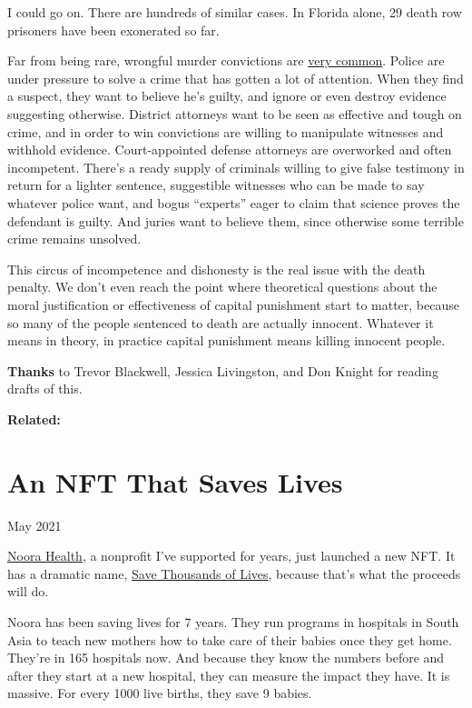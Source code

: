 \documentclass[12pt]{book}
\begin{document}
I could go on. There are hundreds of similar cases. In Florida alone, 29
death row prisoners have been exonerated so far.

Far from being rare, wrongful murder convictions are
\href{https://deathpenaltyinfo.org/policy-issues/innocence/description-of-innocence-cases}{very
common}. Police are under pressure to solve a crime that has gotten a
lot of attention. When they find a suspect, they want to believe he's
guilty, and ignore or even destroy evidence suggesting otherwise.
District attorneys want to be seen as effective and tough on crime, and
in order to win convictions are willing to manipulate witnesses and
withhold evidence. Court-appointed defense attorneys are overworked and
often incompetent. There's a ready supply of criminals willing to give
false testimony in return for a lighter sentence, suggestible witnesses
who can be made to say whatever police want, and bogus ``experts'' eager
to claim that science proves the defendant is guilty. And juries want to
believe them, since otherwise some terrible crime remains unsolved.

This circus of incompetence and dishonesty is the real issue with the
death penalty. We don't even reach the point where theoretical questions
about the moral justification or effectiveness of capital punishment
start to matter, because so many of the people sentenced to death are
actually innocent. Whatever it means in theory, in practice capital
punishment means killing innocent people.

\textbf{Thanks} to Trevor Blackwell, Jessica Livingston, and Don Knight
for reading drafts of this.

\textbf{Related:}
\chapter{An NFT That Saves Lives}

May 2021

\href{https://www.noorahealth.org/}{Noora Health}, a nonprofit I've
supported for years, just launched a new NFT. It has a dramatic name,
\href{http://bit.ly/NooraNFT}{Save Thousands of Lives}, because that's
what the proceeds will do.

Noora has been saving lives for 7 years. They run programs in hospitals
in South Asia to teach new mothers how to take care of their babies once
they get home. They're in 165 hospitals now. And because they know the
numbers before and after they start at a new hospital, they can measure
the impact they have. It is massive. For every 1000 live births, they
save 9 babies.
\end{document}
